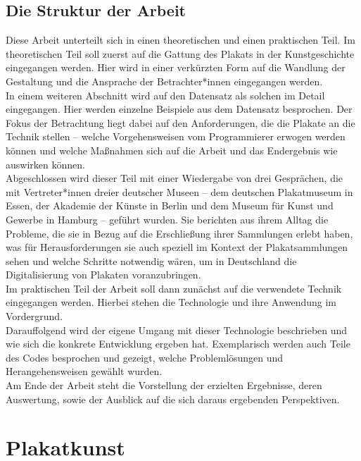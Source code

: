 \documentclass[a4paper,12pt,ngerman]{article}
\begin{document}
\subsection{Die Struktur der Arbeit}
Diese Arbeit unterteilt sich in einen theoretischen und einen praktischen Teil. Im theoretischen Teil soll zuerst auf die Gattung des Plakats in der Kunstgeschichte eingegangen werden. Hier wird in einer verkürzten Form auf die Wandlung der Gestaltung und die Ansprache der Betrachter*innen eingegangen werden. \\
In einem weiteren Abschnitt wird auf den Datensatz als solchen im Detail eingegangen. Hier werden einzelne Beispiele aus dem Datensatz besprochen. Der Fokus der Betrachtung liegt dabei auf den Anforderungen, die die Plakate an die Technik stellen -- welche Vorgehensweisen vom Programmierer erwogen werden können und welche Maßnahmen sich auf die Arbeit und das Endergebnis wie auswirken können. \\
Abgeschlossen wird dieser Teil mit einer Wiedergabe von drei Gesprächen, die mit Vertreter*innen dreier deutscher Museen -- dem deutschen Plakatmuseum in Essen, der Akademie der Künste in Berlin und dem Museum für Kunst und Gewerbe in Hamburg -- geführt wurden. Sie berichten aus ihrem Alltag die Probleme, die sie in Bezug auf die Erschließung ihrer Sammlungen erlebt haben, was für Herausforderungen sie auch speziell im Kontext der Plakatsammlungen sehen und welche Schritte notwendig wären, um in Deutschland die Digitalisierung von Plakaten voranzubringen. \\
Im praktischen Teil der Arbeit soll dann zunächst auf die verwendete Technik eingegangen werden. Hierbei stehen die Technologie und ihre Anwendung im Vordergrund. \\
Darauffolgend wird der eigene Umgang mit dieser Technologie beschrieben und wie sich die konkrete Entwicklung ergeben hat. Exemplarisch werden auch Teile des Codes besprochen und gezeigt, welche Problemlösungen und Herangehensweisen gewählt wurden. \\
Am Ende der Arbeit steht die Vorstellung der erzielten Ergebnisse, deren Auswertung, sowie der Ausblick auf die sich daraus ergebenden Perspektiven. \\

\newpage

\section{Plakatkunst}
\end{document}
